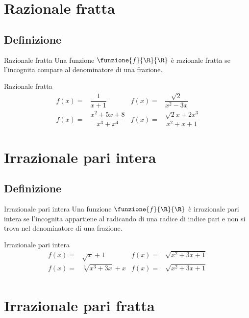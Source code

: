 \section{Razionale fratta}
\subsection{Definizione}
\begin{definizionet}{Razionale fratta}{}
	Una funzione $\funzione{f}{\R}{\R}$ è razionale fratta se l'incognita compare al denominatore di una frazione.
\end{definizionet}
\begin{esempiot}{Razionale fratta}{}
	\begin{align*}
	f(x)=&\dfrac{1}{x+1}&f(x)=&\dfrac{\sqrt{2}}{x^2-3x}\\
	f(x)=&\dfrac{x^2+5x+8}{x^3+x^4}&f(x)=&\dfrac{\sqrt{2}x+2x^3}{x^2+x+1}
	\end{align*}
\end{esempiot}
\section{Irrazionale pari intera}
\subsection{Definizione}
\begin{definizionet}{Irrazionale pari intera}{}
	Una funzione $\funzione{f}{\R}{\R}$ è irrazionale pari intera se l'incognita appartiene al radicando di una radice di indice pari e  non si trova nel denominatore di una frazione. 
\end{definizionet}
\begin{esempiot}{Irrazionale pari intera}{}
\begin{align*}
f(x)=&\sqrt{x}+1&f(x)=&\sqrt{x^2+3x+1}\\
f(x)=&\sqrt[6]{x^3+3x}+x&f(x)=&\sqrt{x^2+3x+1}\\
\end{align*}
\end{esempiot}
\section{Irrazionale pari fratta}
